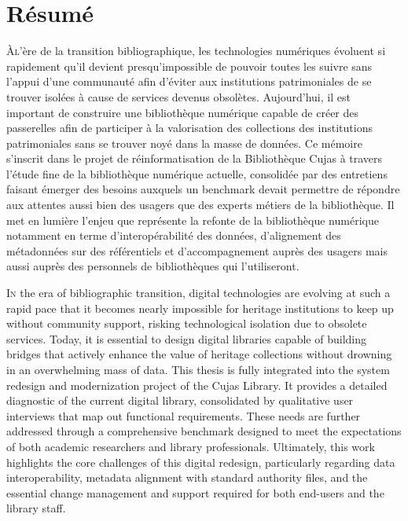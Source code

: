 \documentclass[12pt,twoside]{book}
\begin{document}
\frontmatter


	\chapter{Résumé}
\medskip
	\lettrine{À} l'ère de la transition bibliographique, les technologies numériques évoluent si rapidement qu'il devient presqu'impossible de pouvoir toutes les suivre sans l'appui d'une communauté afin d'éviter aux institutions patrimoniales de se trouver isolées à cause de services devenus obsolètes. Aujourd'hui, il est important de construire une bibliothèque numérique capable de créer des passerelles afin de participer à la valorisation des collections des institutions patrimoniales sans se trouver noyé dans la masse de données. Ce mémoire s'inscrit dans le projet de réinformatisation de la Bibliothèque Cujas à travers l'étude fine de la bibliothèque numérique actuelle, consolidée par des entretiens faisant émerger des besoins auxquels un benchmark devait permettre de répondre aux attentes aussi bien des usagers que des experts métiers de la bibliothèque. Il met en lumière l'enjeu que représente la refonte de la bibliothèque numérique notamment en terme d'interopérabilité des données, d'alignement des métadonnées sur des référentiels et d'accompagnement auprès des usagers mais aussi auprès des personnels de bibliothèques qui l'utiliseront. 
\medskip

	\lettrine{I}n the era of bibliographic transition, digital technologies are evolving at such a rapid pace that it becomes nearly impossible for heritage institutions to keep up without community support, risking technological isolation due to obsolete services. Today, it is essential to design digital libraries capable of building bridges that actively enhance the value of heritage collections without drowning in an overwhelming mass of data. This thesis is fully integrated into the system redesign and modernization project of the Cujas Library. It provides a detailed diagnostic of the current digital library, consolidated by qualitative user interviews that map out functional requirements. These needs are further addressed through a comprehensive benchmark designed to meet the expectations of both academic researchers and library professionals. Ultimately, this work highlights the core challenges of this digital redesign, particularly regarding data interoperability, metadata alignment with standard authority files, and the essential change management and support required for both end-users and the library staff.  
	\medskip
	
\end{document}
